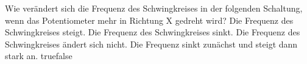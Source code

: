     {Wie verändert sich die Frequenz des Schwingkreises in der folgenden Schaltung, wenn das Potentiometer mehr in Richtung X gedreht wird?}
    {Die Frequenz des Schwingkreises steigt.}
    {Die Frequenz des Schwingkreises sinkt.}
    {Die Frequenz des Schwingkreises ändert sich nicht.}
    {Die Frequenz sinkt zunächst und steigt dann stark an.}
    {true}{false}